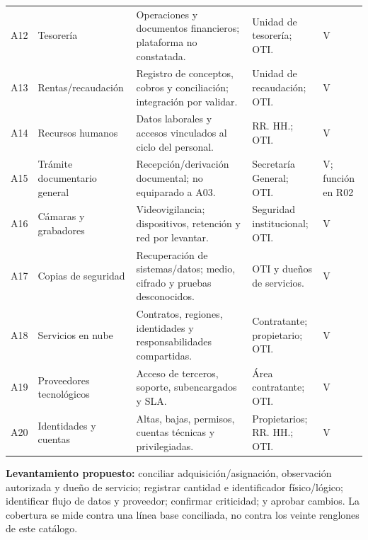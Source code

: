 \documentclass[10pt,a4paper]{article}
\begin{document}
\begin{TablaCompacta}
\begin{longtable}{P{12mm}P{38mm}P{47mm}P{40mm}P{17mm}}
A12 & Tesorería & Operaciones y documentos financieros; plataforma no constatada. & Unidad de tesorería; OTI. & V\\
A13 & Rentas/recaudación & Registro de conceptos, cobros y conciliación; integración por validar. & Unidad de recaudación; OTI. & V\\
A14 & Recursos humanos & Datos laborales y accesos vinculados al ciclo del personal. & RR. HH.; OTI. & V\\
A15 & Trámite documentario general & Recepción/derivación documental; no equiparado a A03. & Secretaría General; OTI. & V; función en R02\\
A16 & Cámaras y grabadores & Videovigilancia; dispositivos, retención y red por levantar. & Seguridad institucional; OTI. & V\\
A17 & Copias de seguridad & Recuperación de sistemas/datos; medio, cifrado y pruebas desconocidos. & OTI y dueños de servicios. & V\\
A18 & Servicios en nube & Contratos, regiones, identidades y responsabilidades compartidas. & Contratante; propietario; OTI. & V\\
A19 & Proveedores tecnológicos & Acceso de terceros, soporte, subencargados y SLA. & Área contratante; OTI. & V\\
A20 & Identidades y cuentas & Altas, bajas, permisos, cuentas técnicas y privilegiadas. & Propietarios; RR. HH.; OTI. & V\\\bottomrule
\end{longtable}
\end{TablaCompacta}
\textbf{Levantamiento propuesto:} conciliar adquisición/asignación, observación autorizada y dueño de servicio; registrar cantidad e identificador físico/lógico; identificar flujo de datos y proveedor; confirmar criticidad; y aprobar cambios. La cobertura se mide contra una línea base conciliada, no contra los veinte renglones de este catálogo.
\end{document}
